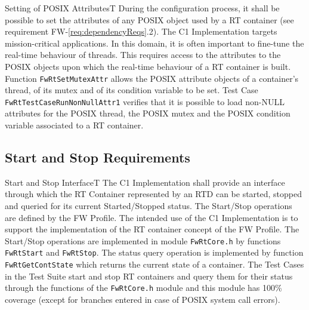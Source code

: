 \documentclass[a4paper,10pt]{article}
\newenvironment{fw_req}[6]
{\addtocounter{subsubsection}{1}
	\hspace{0.2cm}\textbf{FW-\arabic{section}.\arabic{subsection}.\arabic{subsubsection}/#2
	\hspace{0.8cm} #1}
	\vspace{-10pt}
\begin{longtable}{p{2.7cm}P{8.5cm}}
\hline
\textsc{Requirement} & #3 \\
\textsc{Justification} & #4 \\
\textsc{Implementation} & #5  \\ 
\textsc{Verification} & #6  \\
\hline
}
{\end{longtable}}
\begin{document}
\begin{fw_req}{Setting of POSIX Attributes}{T}
{During the configuration process, it shall be possible to set the attributes of any POSIX object used by a RT container (see requirement FW-\ref{req:dependencyReqs}.2).}
{ The C1 Implementation targets mission-critical applications. In this domain, it is often important to fine-tune the real-time behaviour of threads. This requires access to the attributes to the POSIX objects upon which the real-time behaviour of a RT container is built.}
{ Function \texttt{FwRtSetMutexAttr} allows the POSIX attribute objects of a container's thread, of its mutex and of its condition variable to be set. } 
{ Test Case \texttt{FwRtTestCaseRunNonNullAttr1} verifies that it is possible to load non-NULL attributes for the POSIX thread, the POSIX mutex and the POSIX condition variable associated to a RT container.}
\end{fw_req}

\subsection{Start and Stop Requirements}\label{req:startStopInterfaceRTD}

\begin{fw_req}{Start and Stop Interface}{T}
{ The C1 Implementation shall provide an interface through which the  RT Container represented by an RTD can be started, stopped and queried for its current Started/Stopped status.}
{The Start/Stop operations are defined by the FW Profile. The intended use of the C1 Implementation is to support the implementation of the RT container concept of the FW Profile.}
{The Start/Stop operations are implemented in module \texttt{FwRtCore.h} by functions \texttt{FwRtStart} and \texttt{FwRtStop}. The status query operation is implemented by function \texttt{FwRtGetContState} which returns the current state of a container.} 
{The Test Cases in the Test Suite start and stop RT containers and query them for their status through the functions of the \texttt{FwRtCore.h} module and this module has 100\% coverage (except for branches entered in case of POSIX system call errors).}
\end{fw_req}
\end{document}
